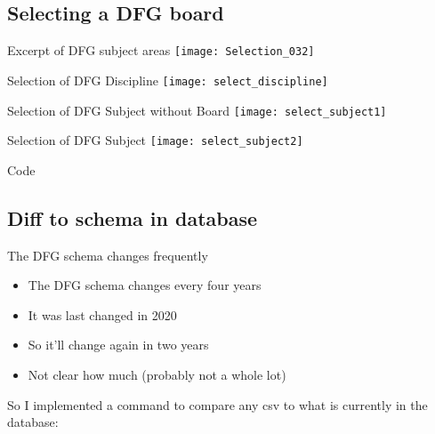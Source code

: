 \subsection{Selecting a DFG board}

\begin{frame}[c]{Excerpt of DFG subject areas}
    \texttt{[image: Selection\_032]}
\end{frame}


\begin{frame}[c]{Selection of DFG Discipline}
    \texttt{[image: select\_discipline]}
\end{frame}
\begin{frame}[c]{Selection of DFG Subject without Board}
    \texttt{[image: select\_subject1]}
\end{frame}
\begin{frame}[c]{Selection of DFG Subject}
    \texttt{[image: select\_subject2]}
\end{frame}


\begin{frame}[c]{Code}
\end{frame}

% 
% 



\subsection{Diff to schema in database}

\begin{frame}[c]{The DFG schema changes frequently}
    \large
    \begin{itemize}[<+(1)->]
        \item The DFG schema changes every four years
        \item It was last changed in 2020
        \item So it'll change again in two years
        \item Not clear how much (probably not a whole lot)
    \end{itemize}
    \pause
    So I implemented a command to compare any csv to what is currently in the database:
\end{frame}


